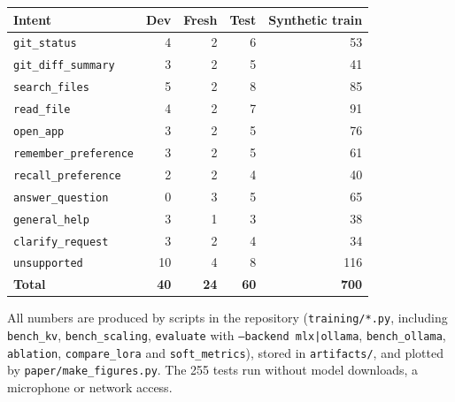 \documentclass[journal]{IEEEtran}
\theoremstyle{definition}
\begin{document}
\begin{center}\small
\begin{tabular}{@{}lrrrr@{}}
\toprule
Intent & Dev & Fresh & Test & Synthetic train \\
\midrule
\texttt{git\_status} & 4 & 2 & 6 & 53 \\
\texttt{git\_diff\_summary} & 3 & 2 & 5 & 41 \\
\texttt{search\_files} & 5 & 2 & 8 & 85 \\
\texttt{read\_file} & 4 & 2 & 7 & 91 \\
\texttt{open\_app} & 3 & 2 & 5 & 76 \\
\texttt{remember\_preference} & 3 & 2 & 5 & 61 \\
\texttt{recall\_preference} & 2 & 2 & 4 & 40 \\
\texttt{answer\_question} & 0 & 3 & 5 & 65 \\
\texttt{general\_help} & 3 & 1 & 3 & 38 \\
\texttt{clarify\_request} & 3 & 2 & 4 & 34 \\
\texttt{unsupported} & 10 & 4 & 8 & 116 \\
\midrule
\textbf{Total} & \textbf{40} & \textbf{24} & \textbf{60} & \textbf{700} \\
\bottomrule
\end{tabular}
\end{center}

All numbers are produced by scripts in the repository (\texttt{training/*.py}, including
\texttt{bench\_kv}, \texttt{bench\_scaling}, \texttt{evaluate} with \texttt{--backend mlx|ollama},
\texttt{bench\_ollama}, \texttt{ablation}, \texttt{compare\_lora} and \texttt{soft\_metrics}), stored
in \texttt{artifacts/}, and plotted by \texttt{paper/make\_figures.py}. The 255 tests run without
model downloads, a microphone or network access.
\end{document}
